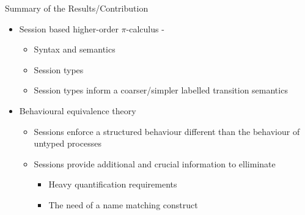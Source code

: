 \documentclass{beamer}
\begin{document}
	\begin{frame}{Summary of the Results/Contribution}
		\begin{itemize}
			\item	Session based higher-order $\pi$-calculus - \HOp
				\begin{itemize}
					\item	Syntax and semantics
					\item	Session types
					\item	Session types inform a coarser/simpler labelled transition semantics
				\end{itemize}

			\item	Behavioural equivalence theory
				\begin{itemize}
					\item	Sessions enforce a structured behaviour different than
						the behaviour of untyped processes %
					\item	Sessions provide additional and crucial information to elliminate
					\begin{itemize}
						\item	Heavy quantification requirements
						\item	The need of a name matching construct
					\end{itemize}
				\end{itemize}
		\end{itemize}

	\end{frame}
\end{document}
